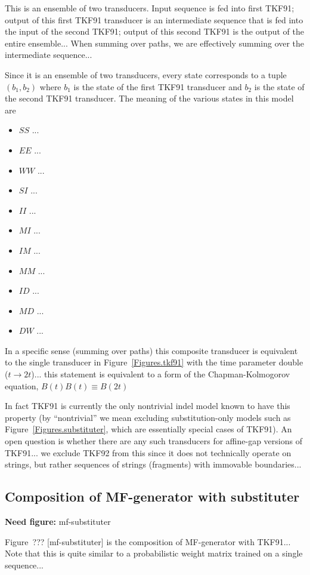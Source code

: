\documentclass{article}
\newcommand{\figref}[1]{Figure~\ref{Figures.#1}}
\newcommand{\needfig}[1]{{\bf Need figure: } #1 }
\newcommand{\needfigref}[1]{Figure~??? [#1] }
\begin{document}
This is an ensemble of two transducers.
Input sequence is fed into first TKF91;
output of this first TKF91 transducer is an intermediate sequence that is fed into the input of the second TKF91;
output of this second TKF91 is the output of the entire ensemble...
When summing over paths, we are effectively summing over the intermediate sequence...

Since it is an ensemble of two transducers, every state corresponds to a tuple $(b_1,b_2)$
where
$b_1$ is the state of the first TKF91 transducer and
$b_2$ is the state of the second TKF91 transducer.
The meaning of the various states in this model are
\begin{itemize}
\item $SS$ ...
\item $EE$ ...
\item $WW$ ...
\item $SI$ ...
\item $II$ ...
\item $MI$ ...
\item $IM$ ...
\item $MM$ ...
\item $ID$ ...
\item $MD$ ...
\item $DW$ ...
\end{itemize}

In a specific sense (summing over paths)
this composite transducer is equivalent to the single transducer in \figref{tkf91}
with the time parameter double ($t \to 2t$)...
this statement is equivalent to a form of the Chapman-Kolmogorov equation,
$B(t)B(t) \equiv B(2t)$

In fact TKF91 is currently the only nontrivial indel model known to have this property
(by ``nontrivial'' we mean excluding substitution-only models such as \figref{substituter},
which are essentially special cases of TKF91).
An open question is whether there are any such transducers for affine-gap versions of TKF91...
we exclude TKF92 from this since it does not technically operate on strings, but rather
sequences of strings (fragments) with immovable boundaries...

\subsection{Composition of MF-generator with substituter}
\needfig{mf-substituter}

\needfigref{mf-substituter} is the composition of MF-generator with TKF91...
Note that this is quite similar to a probabilistic weight matrix trained on a single sequence...
\end{document}
